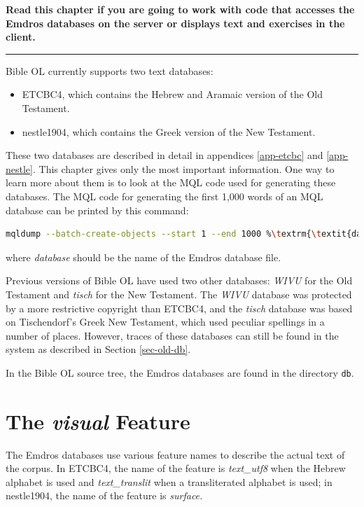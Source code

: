 \documentclass[11pt,oneside,a4paper]{memoir}
\begin{document}
\textbf{Read this chapter if you are going to work with code that accesses the Emdros databases on
  the server or displays text and exercises in the client.}
\plainbreak{3}

Bible OL currently supports two text databases:

\begin{itemize}
\item ETCBC4, which contains the Hebrew and Aramaic version of the Old Testament.
\item nestle1904, which contains the Greek version of the New Testament.
\end{itemize}

These two databases are described in detail in appendices \ref{app-etcbc} and
\ref{app-nestle}. This chapter gives only the most important information.
One way to learn more about them is to look at the MQL code used for generating these databases. The
MQL code for generating the first 1,000 words of an MQL database can be printed by this command:

\begin{lstlisting}[language=bash]
mqldump --batch-create-objects --start 1 --end 1000 %\textrm{\textit{database}}\label{list-mqldump}%
\end{lstlisting}

\noindent
where \emph{database} should be the name of the Emdros database file.

Previous versions of Bible OL have used two other databases: \emph{WIVU} for the Old Testament and
\emph{tisch} for the New Testament. The \emph{WIVU} database was protected by a more restrictive
copyright than ETCBC4, and the \emph{tisch} database was based on Tischendorf's Greek New Testament,
which used peculiar spellings in a number of places. However, traces of these databases can still be
found in the system as described in Section \ref{sec-old-db}.

In the Bible OL source tree, the Emdros databases are found in the directory \texttt{db}.


\section{The \emph{visual} Feature}

The Emdros databases use various feature names to describe the actual text of the corpus. In ETCBC4,
the name of the feature is \emph{text\_utf8} when the Hebrew alphabet is used and
\emph{text\_translit} when a transliterated alphabet is used; in nestle1904, the name of the feature
is \emph{surface.}
\end{document}
